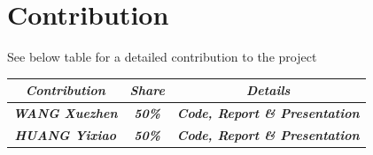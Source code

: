 \documentclass{article}
\begin{document}









\appendix
\section{Contribution}
See below table for a detailed contribution to the project
\begin{table}[!h]
\begin{tabular}{|c|c|c|}
\hline
\textit{\textbf{Contribution}} & \textit{\textbf{Share}} & \textit{\textbf{Details}}                                     \\ \hline
\textit{\textbf{WANG Xuezhen}} & \textit{\textbf{50\%}}       & \textit{\textbf{Code, Report \& Presentation}} \\ \hline
\textit{\textbf{HUANG Yixiao}} & \textit{\textbf{50\%}}       & \textit{\textbf{Code, Report \& Presentation}} \\ \hline
\end{tabular}
\end{table}
\end{document}
